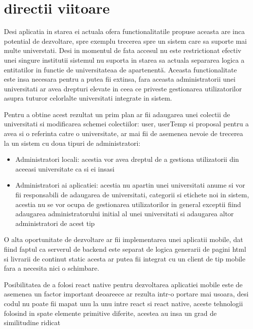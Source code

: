 \documentclass[12pt,a4paper,hidelinks]{report}
\theoremstyle{definition}
\theoremstyle{remark}
\begin{document}
\section{directii viitoare}
Desi aplicatia in starea ei actuala ofera functionalitatile propuse aceasta are inca 
potential de dezvoltare, spre exemplu trecerea spre un sistem care sa suporte mai multe universtati. 
Desi in momentul de fata accesul nu este restrictionat efectiv unei singure institutii
sistemul nu suporta in starea sa actuala separarea logica a entitatilor in functie de universitateaa de apartenentă.
Aceasta functionalitate este insa necesara pentru a putea fii extinsa, fara aceasta administratorii unei universitati ar avea drepturi elevate
in ceea ce priveste gestionarea utilizatorilor asupra tuturor celorlalte universitati integrate in sistem.

Pentru a obtine acest rezultat un prim plan ar fii adaugarea unei colectii de universitati si modificarea schemei colectiilor: 
user, userTemp si proposal pentru a avea si o referinta catre o universitate, ar mai fii de asemenea nevoie de trecerea la un sistem
cu doua tipuri de administratori:
\begin{itemize}
    \item Administratori locali: acestia vor avea dreptul de a gestiona utilizatorii din aceeasi universitate ca si ei insasi
    \item Administratori ai aplicatiei: acestia nu apartin unei universitati anume si vor fii responsabili de adaugarea de 
    universitati, categorii si etichete noi in sistem, acestia nu se vor ocupa de gestionarea utilizatorilor in general exceptii fiind 
    adaugarea administratorului initial al unei universitati si adaugarea altor administratori de acest tip
\end{itemize}

O alta oportunitate de dezvoltare ar fii implementarea unei aplicatii mobile, dat fiind faptul ca serverul de backend 
este separat de logica generarii de pagini html si livrarii de continut static acesta ar putea fii integrat cu un client
de tip mobile fara a necesita nici o schimbare.

Posibilitatea de a folosi react native pentru dezvoltarea aplicatiei mobile este de asemenea un factor important deoareece
ar rezulta intr-o portare mai usoara, desi codul nu poate fii mapat unu la unu intre react si react native, aceste tehnologii folosind 
in spate elemente primitive diferite, acestea au insa un grad de similitudine ridicat
%
%
\end{document}

